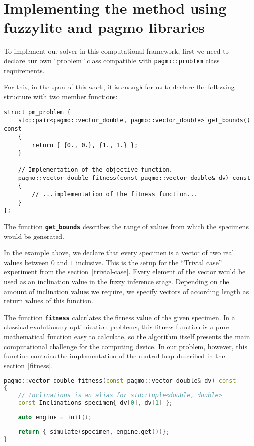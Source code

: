 \documentclass[12pt, a4paper]{report}
\begin{document}
	\section{Implementing the method using fuzzylite and pagmo libraries}\label{section::implementation}
	
	To implement our solver in this computational framework, first we need to declare our own ``problem'' class compatible with \texttt{pagmo::problem} class requirements.
	
	For this, in the span of this work, it is enough for us to declare the following structure with two member functions:
	
	\begin{lstlisting}[language={[11]c++}]
struct pm_problem {
	std::pair<pagmo::vector_double, pagmo::vector_double> get_bounds() const
	{
		return { {0., 0.}, {1., 1.} };
	}
	
	// Implementation of the objective function.
	pagmo::vector_double fitness(const pagmo::vector_double& dv) const
	{
		// ...implementation of the fitness function...
	}
};
	\end{lstlisting}
	
	The function \textbf{\texttt{get\_bounds}} describes the range of values from which the specimens would be generated.
	
	In the example above, we declare that every specimen is a vector of two real values between $0$ and $1$ inclusive.
	This is the setup for the ``Trivial case'' experiment from the section~\ref{trivial-case}.
	Every element of the vector would be used as an inclination value in the fuzzy inference stage.
	Depending on the amount of inclination values we require, we specify vectors of according length as return values of this function.
	
	The function \textbf{\texttt{fitness}} calculates the fitness value of the given specimen.
	In a classical evolutionary optimization problems, this fitness function is a pure mathematical function easy to calculate, so the algorithm itself presents the main computational challenge for the computing device.
	In our problem, however, this function contains the implementation of the control loop described in the section~\ref{fitness}.
	
	\begin{lstlisting}[language=c++]
pagmo::vector_double fitness(const pagmo::vector_double& dv) const
{
	// Inclinations is an alias for std::tuple<double, double>
	const Inclinations specimen{ dv[0], dv[1] };
	
	auto engine = init();
	
	return { simulate(specimen, engine.get())};
}
	\end{lstlisting}
	
\end{document}
